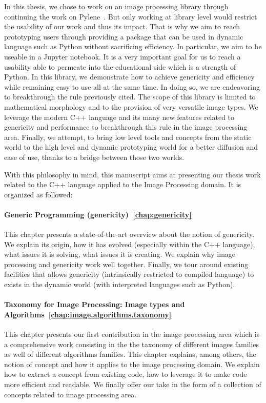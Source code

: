 In this thesis, we chose to work on an image processing library through continuing the work on
Pylene~\parencite{carlinet.2018.pylena}. But only working at library level would restrict the usability of our work and
thus its impact. That is why we aim to reach prototyping users through providing a package that can be used in dynamic
language such as Python without sacrificing efficiency. In particular, we aim to be useable in a Jupyter notebook. It is
a very important goal for us to reach a usability able to permeate into the educational side which is a strength of
Python. In this library, we demonstrate how to achieve genericity and efficiency while remaining easy to use all at the
same time. In doing so, we are endeavoring to breakthrough the rule previously cited. The scope of this library is
limited to mathematical morphology and to the provision of very versatile image types. We leverage the modern C++
language and its many new features related to genericity and performance to breakthrough this rule in the image
processing area. Finally, we attempt, to bring low level tools and concepts from the static world to the high level and
dynamic prototyping world for a better diffusion and ease of use, thanks to a bridge between those two worlds.

With this philosophy in mind, this manuscript aims at presenting our thesis work related to the C++ language applied to
the Image Processing domain. It is organized as followed:

\paragraph{Generic Programming (genericity)~\ref{chap:genericity}} This chapter presents a state-of-the-art overview
about the notion of genericity. We explain its origin, how it has evolved (especially within the C++ language), what
issues it is solving, what issues it is creating. We explain why image processing and genericity work well together.
Finally, we tour around existing facilities that allows genericity (intrinsically restricted to compiled language) to
exists in the dynamic world (with interpreted languages such as Python).

\paragraph{Taxonomy for Image Processing: Image types and Algorithms~\ref{chap:image.algorithms.taxonomy}} This chapter
presents our first contribution in the image processing area which is a comprehensive work consisting in the the
taxonomy of different images families as well of different algorithms families. This chapter explains, among others, the
notion of concept and how it applies to the image processing domain. We explain how to extract a concept from existing
code, how to leverage it to make code more efficient and readable. We finally offer our take in the form of a collection
of concepts related to image processing area.

